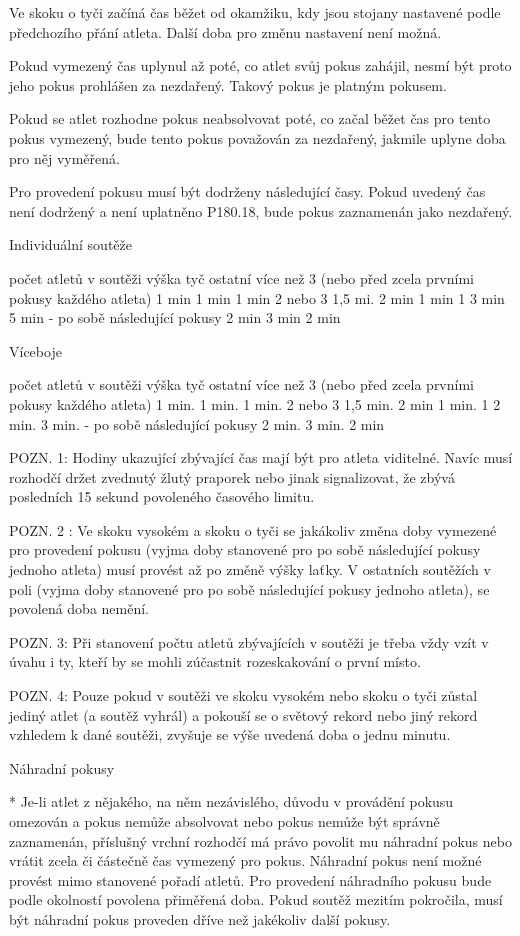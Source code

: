 Ve skoku o tyči začíná čas běžet od okamžiku, kdy jsou stojany nastavené podle předchozího přání atleta. Další doba pro změnu nastavení není možná.

Pokud vymezený čas uplynul až poté, co atlet svůj pokus zahájil, nesmí být proto jeho pokus prohlášen za nezdařený. Takový pokus je platným pokusem.

Pokud se atlet rozhodne pokus neabsolvovat poté, co začal běžet čas pro tento pokus vymezený, bude tento pokus považován za nezdařený, jakmile uplyne doba pro něj vyměřená.

Pro provedení pokusu musí být dodrženy následující časy. Pokud uvedený čas není dodržený a není uplatněno P180.18, bude pokus zaznamenán jako nezdařený.

Individuální soutěže

počet atletů v soutěži	výška 	tyč	ostatní
více než 3
(nebo před zcela prvními
pokusy každého atleta)	1 min	1 min	1 min
2 nebo 3			1,5 mi.	2 min	1 min
1			3 min	5 min	     -
po sobě následující pokusy 	2 min	3 min	2 min

Víceboje

počet atletů v soutěži	výška 	tyč	ostatní
více než 3
(nebo před zcela prvními
pokusy každého atleta)	1 min.	1 min.	1 min.
2 nebo 3			1,5 min.	2 min    	1 min.
1 	                  		2 min.	3 min.	   -
po sobě následující pokusy 	2 min.	3 min.	2 min

POZN. 1: Hodiny ukazující zbývající čas mají být pro atleta viditelné. Navíc musí rozhodčí držet zvednutý žlutý praporek nebo jinak signalizovat, že zbývá posledních 15 sekund povoleného časového limitu.

POZN. 2 : Ve skoku vysokém a skoku o tyči se jakákoliv změna doby vymezené pro provedení pokusu (vyjma doby stanovené pro po sobě následující pokusy jednoho atleta) musí provést až po změně výšky laťky. V ostatních soutěžích v poli (vyjma doby stanovené pro po sobě následující pokusy jednoho atleta), se povolená doba nemění.

POZN. 3: Při stanovení počtu atletů zbývajících v soutěži je třeba vždy vzít v úvahu i ty, kteří by se mohli zúčastnit rozeskakování o první místo.

POZN. 4: Pouze pokud v soutěži ve skoku vysokém nebo skoku o tyči zůstal jediný atlet (a soutěž vyhrál) a pokouší se o světový rekord nebo jiný rekord vzhledem k dané soutěži, zvyšuje se výše uvedená doba o jednu minutu.

Náhradní pokusy

* Je-li atlet z nějakého, na něm nezávislého, důvodu v provádění pokusu omezován a pokus nemůže absolvovat nebo pokus nemůže být správně zaznamenán, příslušný vrchní rozhodčí má právo povolit mu náhradní pokus nebo vrátit zcela či částečně čas vymezený pro pokus. Náhradní pokus není možné provést mimo stanovené pořadí atletů. Pro provedení náhradního pokusu bude podle okolností povolena přiměřená doba. Pokud soutěž mezitím pokročila, musí být náhradní pokus proveden dříve než jakékoliv další pokusy.

